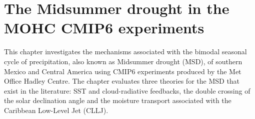 
\chapter{\label{ch:6-msd}The Midsummer drought in the MOHC CMIP6 experiments}

This chapter investigates the mechanisms associated with  the bimodal seasonal cycle of precipitation, also known as Midsummer drought (MSD), of southern Mexico and Central America using CMIP6 experiments produced by the Met Office Hadley Centre.
The chapter evaluates three theories for the MSD that exist in the literature: SST and cloud-radiative feedbacks, the double crossing of the solar declination angle and the moisture transport associated with the Caribbean Low-Level Jet (CLLJ). 
